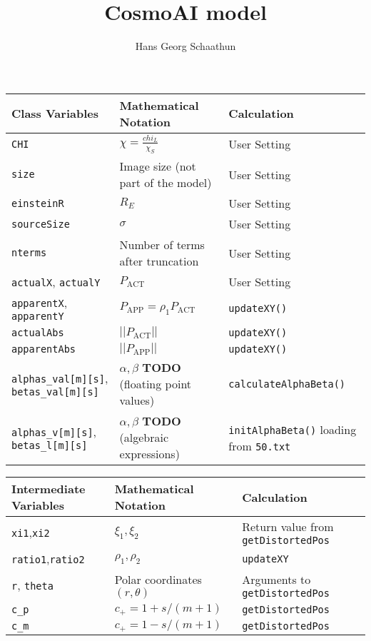 \documentclass{scrartcl}
\title{CosmoAI model}
\author{Hans Georg Schaathun}
\begin{document}
\maketitle

\begin{center}
\begin{tabular}{l|l|l}
\hline
  Class Variables & Mathematical Notation & Calculation \\
\hline
\hline
   \texttt{CHI}       & $\chi=\frac{chi_L}{\chi_S}$      & User Setting \\
   \texttt{size}      & Image size (not part of the model) & User Setting \\
   \texttt{einsteinR} & $R_E$                              & User Setting \\
   \texttt{sourceSize} & $\sigma$                          & User Setting \\
   \texttt{nterms}    & Number of terms after truncation    & User Setting \\
   \texttt{actualX}, \texttt{actualY} & $P_{\textrm{ACT}}$  & User Setting\\
   \texttt{apparentX}, \texttt{apparentY} 
         & $P_{\textrm{APP}}=\rho_1P_{\textrm{ACT}}$ & \texttt{updateXY()} \\
   \texttt{actualAbs} & $||P_{\textrm{ACT}}||$ & \texttt{updateXY()} \\
   \texttt{apparentAbs} & $||P_{\textrm{APP}}||$ & \texttt{updateXY()} \\
   \texttt{alphas\_val[m][s]},
   \texttt{betas\_val[m][s]}  & $\alpha,\beta$ \textbf{TODO}
        (floating point values)
        & \texttt{calculateAlphaBeta()} \\
   \texttt{alphas\_v[m][s]},
   \texttt{betas\_l[m][s]}  & $\alpha,\beta$ \textbf{TODO}
        (algebraic expressions)
        & \texttt{initAlphaBeta()} loading from \texttt{50.txt} \\
\hline
\end{tabular}
\end{center}

\begin{center}
\begin{tabular}{l|l|l}
\hline
   Intermediate Variables & Mathematical Notation & Calculation \\
\hline
\hline
   \texttt{xi1},\texttt{xi2}       & $\xi_1,\xi_2$     & Return value from \texttt{getDistortedPos} \\
   \texttt{ratio1},\texttt{ratio2} & $\rho_1,\rho_2$   & \texttt{updateXY}        \\
   \texttt{r}, \texttt{theta} & Polar coordinates $(r,\theta)$ &
      Arguments to \texttt{getDistortedPos} \\
   \texttt{c\_p} & $c_+=1+s/(m+1)$ & \texttt{getDistortedPos} \\
   \texttt{c\_m} & $c_+=1-s/(m+1)$ & \texttt{getDistortedPos} \\
\hline
\end{tabular}
\end{center}
\end{document}
